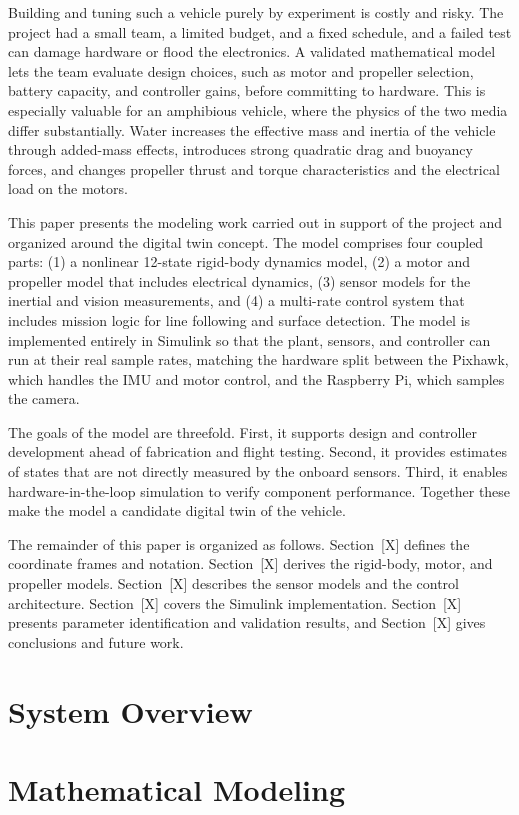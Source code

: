 \documentclass[conf]{new-aiaa}
\begin{document}
Building and tuning such a vehicle purely by experiment is costly and risky.
The project had a small team, a limited budget, and a fixed schedule, and a
failed test can damage hardware or flood the electronics. A validated
mathematical model lets the team evaluate design choices, such as motor and
propeller selection, battery capacity, and controller gains, before committing
to hardware. This is especially valuable for an amphibious vehicle, where the
physics of the two media differ substantially. Water increases the effective
mass and inertia of the vehicle through added-mass effects, introduces strong
quadratic drag and buoyancy forces, and changes propeller thrust and torque
characteristics and the electrical load on the motors.

This paper presents the modeling work carried out in support of the project and
organized around the digital twin concept. The model comprises four
coupled parts: (1) a nonlinear 12-state rigid-body dynamics model, (2) a motor
and propeller model that includes electrical dynamics, (3) sensor models for
the inertial and vision measurements, and (4) a multi-rate control system that
includes mission logic for line following and surface detection. The model is
implemented entirely in Simulink so that the plant, sensors, and controller can
run at their real sample rates, matching the hardware split between the
Pixhawk, which handles the IMU and motor control, and the Raspberry Pi, which
samples the camera.

The goals of the model are threefold. First, it supports design and controller
development ahead of fabrication and flight testing. Second, it provides
estimates of states that are not directly measured by the onboard sensors.
Third, it enables hardware-in-the-loop simulation to verify component
performance. Together these make the model a candidate digital twin of the
vehicle.

The remainder of this paper is organized as follows. Section~[X] defines the
coordinate frames and notation. Section~[X] derives the rigid-body, motor, and
propeller models. Section~[X] describes the sensor models and the control
architecture. Section~[X] covers the Simulink implementation. Section~[X]
presents parameter identification and validation results, and Section~[X]
gives conclusions and future work.
\section{System Overview}

\section{Mathematical Modeling}
\end{document}
